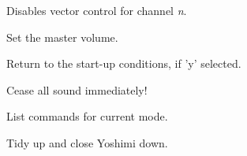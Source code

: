       Disables vector control for channel \textsl{n}.

      Set the master volume.

      Return to the start-up conditions, if 'y' selected.

      Cease all sound immediately!

      List commands for current mode.

         Tidy up and close Yoshimi down.

